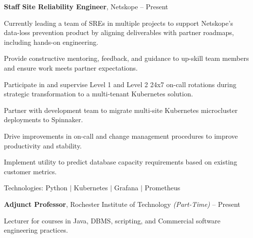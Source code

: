 \documentclass[letterpaper,MMMMyyyy,nonstopmode]{simpleresumecv}
\newcommand{\tech}[1]{\textrm{Technologies:} #1}
\newif\ifLOCATION
\begin{document}
\begin{Body}
\Entry
\textbf{Staff Site Reliability Engineer}, Netskope
\hfill
 -- Present

\Gap
\begin{Detail}

Currently leading a team of SREs in multiple projects to support Netskope's data-loss prevention product by aligning deliverables with partner roadmaps, including hands-on engineering.

\Gap

\BulletItem
Provide constructive mentoring, feedback, and guidance to up-skill team members and ensure work meets partner expectations.

\BulletItem
Participate in and supervise Level 1 and Level 2 24x7 on-call rotations during strategic transformation to a multi-tenant Kubernetes solution.

\BulletItem
Partner with development team to migrate multi-site Kubernetes microcluster deployments to Spinnaker.

\BulletItem
Drive improvements in on-call and change management procedures to improve productivity and stability.

\BulletItem
Implement utility to predict database capacity requirements based on existing customer metrics.




\end{Detail}

\tech{Python $|$ Kubernetes $|$ Grafana $|$ Prometheus}

\BigGap

\Entry
\textbf{Adjunct Professor}, Rochester Institute of Technology \textit{(Part-Time)}
\hfill
 --
Present

\ifLOCATION
\hfill 
Rochester, New York
\fi

\Gap
\begin{Detail}
Lecturer for courses in Java, DBMS, scripting, and Commercial software engineering practices.
\iffalse
\BulletItem
Currently teaching course in software engineering practices used in industry.
\BulletItem
Previously taught courses in Java and DBMS/SQL.
\fi
\end{Detail}


\end{Body}
\end{document}
